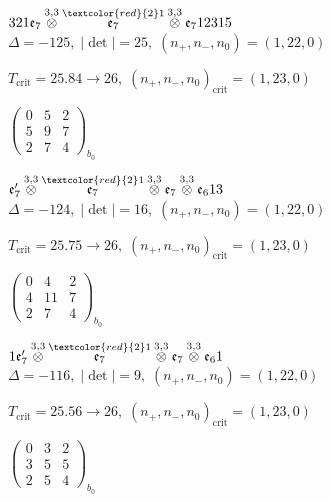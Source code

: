 \documentclass[10pt]{article}
\begin{document}
\smallskip

$321\mathfrak{e}_7\overset{3,3}{\otimes}\overset{\textcolor{red}{2}1}{\mathfrak{e}_7}\overset{3,3}{\otimes}\mathfrak{e}_712315$ \quad $\Delta=-125,\; |\det|=25,\; (n_+,n_-,n_0)=(1,22,0)$

\hspace{1em}$T_{\text{crit}}=25.84 \to 26,\; (n_+,n_-,n_0)_{\text{crit}}=(1,23,0)$

\hspace{2em}$\left(\begin{smallmatrix}0 & 5 & 2 \\ 5 & 9 & 7 \\ 2 & 7 & 4\end{smallmatrix}\right)_{\!b_0}$

\smallskip

$\mathfrak{e}_7'\overset{3,3}{\otimes}\overset{\textcolor{red}{2}1}{\mathfrak{e}_7}\overset{3,3}{\otimes}\mathfrak{e}_7\overset{3,3}{\otimes}\mathfrak{e}_613$ \quad $\Delta=-124,\; |\det|=16,\; (n_+,n_-,n_0)=(1,22,0)$

\hspace{1em}$T_{\text{crit}}=25.75 \to 26,\; (n_+,n_-,n_0)_{\text{crit}}=(1,23,0)$

\hspace{2em}$\left(\begin{smallmatrix}0 & 4 & 2 \\ 4 & 11 & 7 \\ 2 & 7 & 4\end{smallmatrix}\right)_{\!b_0}$

\smallskip

$1\mathfrak{e}_7'\overset{3,3}{\otimes}\overset{\textcolor{red}{2}1}{\mathfrak{e}_7}\overset{3,3}{\otimes}\mathfrak{e}_7\overset{3,3}{\otimes}\mathfrak{e}_61$ \quad $\Delta=-116,\; |\det|=9,\; (n_+,n_-,n_0)=(1,22,0)$

\hspace{1em}$T_{\text{crit}}=25.56 \to 26,\; (n_+,n_-,n_0)_{\text{crit}}=(1,23,0)$

\hspace{2em}$\left(\begin{smallmatrix}0 & 3 & 2 \\ 3 & 5 & 5 \\ 2 & 5 & 4\end{smallmatrix}\right)_{\!b_0}$
\end{document}
